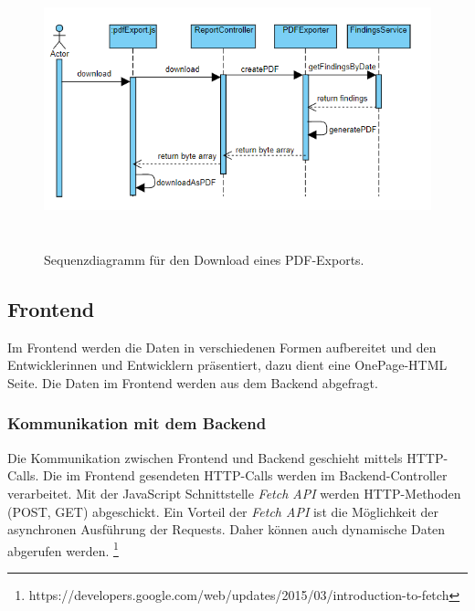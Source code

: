 \begin{figure}[tp]
  \centering
  \includegraphics[height=8cm]{images/seqGeneratePdf.PNG}
 \caption[Sequenzdiagramm für den Download eines PDF-Exports]{Sequenzdiagramm für den Download eines PDF-Exports.}
  \label{fig:engine}
\end{figure}

\subsection{Frontend}
Im Frontend werden die Daten in verschiedenen Formen aufbereitet und den Entwicklerinnen und Entwicklern präsentiert, dazu dient eine OnePage-HTML Seite. Die Daten im Frontend werden aus dem Backend abgefragt.
\subsubsection{Kommunikation mit dem Backend}
Die Kommunikation zwischen Frontend und Backend geschieht mittels HTTP-Calls. Die im Frontend gesendeten HTTP-Calls werden im Backend-Controller verarbeitet.  Mit der JavaScript Schnittstelle \textit{Fetch API} werden HTTP-Methoden (POST, GET) abgeschickt. Ein Vorteil der  \textit{Fetch API} ist die Möglichkeit der asynchronen Ausführung der Requests. Daher können auch dynamische Daten abgerufen werden. \footnote{https://developers.google.com/web/updates/2015/03/introduction-to-fetch}
\lstset{
  caption={Erstellung eines GET-Request für Projektdaten mit der Schnittstelle Fetch API.}, 
  basicstyle=\small\ttfamily, 
  label=lst:fetchApiGet, 
  language=Java,
  frame=single,
  breaklines=true, %
  postbreak=\mbox{\textcolor{red}{$\hookrightarrow$}\space},
}

